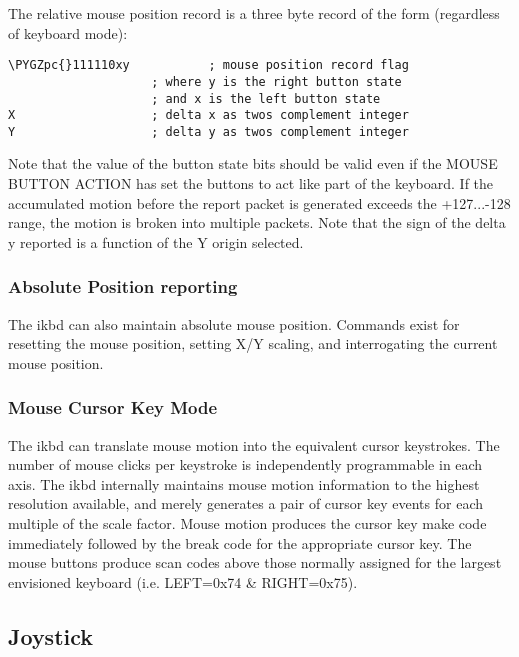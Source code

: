 \documentclass[a4paper,8pt,english]{sphinxmanual}
\def\PYGZpc{\char`\%}
\begin{document}
The relative mouse position record is a three byte record of the form
(regardless of keyboard mode):

\begin{Verbatim}[commandchars=\\\{\}]
\PYGZpc{}111110xy           ; mouse position record flag
                    ; where y is the right button state
                    ; and x is the left button state
X                   ; delta x as twos complement integer
Y                   ; delta y as twos complement integer
\end{Verbatim}

Note that the value of the button state bits should be valid even if the
MOUSE BUTTON ACTION has set the buttons to act like part of the keyboard.
If the accumulated motion before the report packet is generated exceeds the
+127...-128 range, the motion is broken into multiple packets.
Note that the sign of the delta y reported is a function of the Y origin
selected.


\subsubsection{Absolute Position reporting}
\label{input/devices/atarikbd:absolute-position-reporting}
The ikbd can also maintain absolute mouse position. Commands exist for
resetting the mouse position, setting X/Y scaling, and interrogating the
current mouse position.


\subsubsection{Mouse Cursor Key Mode}
\label{input/devices/atarikbd:mouse-cursor-key-mode}
The ikbd can translate mouse motion into the equivalent cursor keystrokes.
The number of mouse clicks per keystroke is independently programmable in
each axis. The ikbd internally maintains mouse motion information to the
highest resolution available, and merely generates a pair of cursor key events
for each multiple of the scale factor.
Mouse motion produces the cursor key make code immediately followed by the
break code for the appropriate cursor key. The mouse buttons produce scan
codes above those normally assigned for the largest envisioned keyboard (i.e.
LEFT=0x74 \& RIGHT=0x75).


\subsection{Joystick}
\label{input/devices/atarikbd:joystick}
\end{document}
